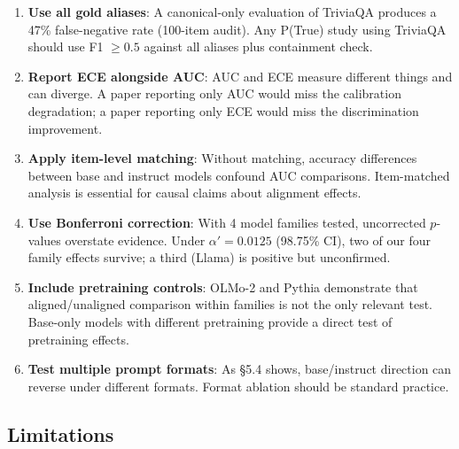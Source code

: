 \documentclass[11pt]{article}
\begin{document}
\begin{enumerate}
  \item \textbf{Use all gold aliases}: A canonical-only evaluation of TriviaQA produces a 47\% false-negative rate (100-item audit). Any P(True) study using TriviaQA should use F1 $\geq 0.5$ against all aliases plus containment check.
  \item \textbf{Report ECE alongside AUC}: AUC and ECE measure different things and can diverge. A paper reporting only AUC would miss the calibration degradation; a paper reporting only ECE would miss the discrimination improvement.
  \item \textbf{Apply item-level matching}: Without matching, accuracy differences between base and instruct models confound AUC comparisons. Item-matched analysis is essential for causal claims about alignment effects.
  \item \textbf{Use Bonferroni correction}: With 4 model families tested, uncorrected $p$-values overstate evidence. Under $\alpha' = 0.0125$ (98.75\% CI), two of our four family effects survive; a third (Llama) is positive but unconfirmed.
  \item \textbf{Include pretraining controls}: OLMo-2 and Pythia demonstrate that aligned/unaligned comparison within families is not the only relevant test. Base-only models with different pretraining provide a direct test of pretraining effects.
  \item \textbf{Test multiple prompt formats}: As \S5.4 shows, base/instruct direction can reverse under different formats. Format ablation should be standard practice.
\end{enumerate}

\subsection{Limitations}
\end{document}
